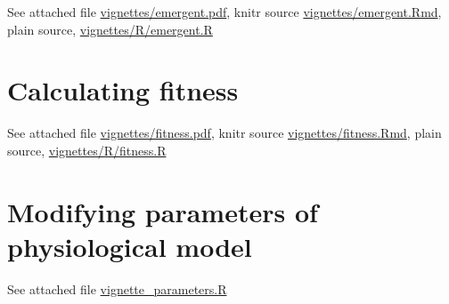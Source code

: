 \documentclass[a4paper,11pt]{article}
\begin{document}
\begin{appendices}
See attached file \url{vignettes/emergent.pdf}, knitr source
\url{vignettes/emergent.Rmd}, plain source, \url{vignettes/R/emergent.R}

\section{Calculating fitness}\label{sec:fitness}

See attached file \url{vignettes/fitness.pdf}, knitr source
\url{vignettes/fitness.Rmd}, plain source, \url{vignettes/R/fitness.R}

\section{Modifying parameters of physiological model}\label{sec:parameters}

See attached file \url{vignette_parameters.R}

\end{appendices}
\end{document}
